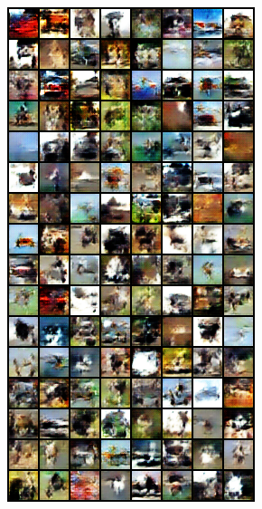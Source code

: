 \begin{figure}[H]
\begin{subfigure}{0.2\textwidth}
    \end{subfigure}%
    \begin{subfigure}{0.2\textwidth}
        \centering
        \includegraphics[width=0.95\linewidth]{cifar10/32/fake_sample_epoch_0010.png}
        \caption{}
        \label{subfig:cifar10/32/fake_sample_epoch_0010}
    \end{subfigure}%

\end{figure}
